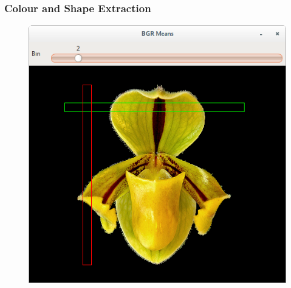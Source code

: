 \documentclass[]{beamer}
\begin{document}
    \begin{frame}[plain]
        \frametitle{Colour and Shape Extraction}

        \begin{figure}[h]
        \centering
        \includegraphics[width=.60\textwidth]{BGR_means_bins}
        \end{figure}
    \end{frame}
\end{document}
